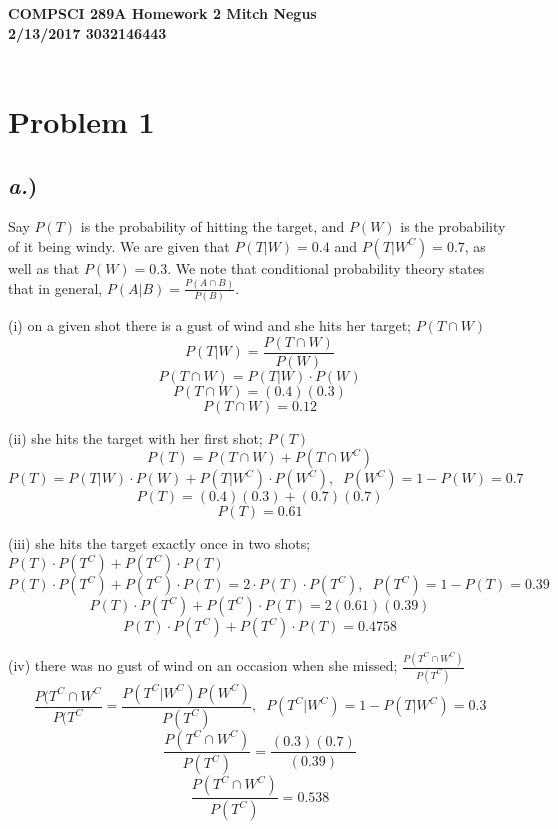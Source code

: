 \documentclass{report}
\begin{document}
\thispagestyle{empty}

{\bf {\large {COMPSCI 289A} Homework {2} \hfill Mitch Negus\\
		2/13/2017 						\hfill	3032146443}}\\\\


\section*{Problem 1}

\subsection*{\textit{a.})}

Say $P(T)$ is the probability of hitting the target, and $P(W)$ is the probability of it being windy. We are given that $P(T|W) = 0.4$ and $P(T|W^{C}) = 0.7$, as well as that $P(W) = 0.3$. We note that conditional probability theory states that in general, $P(A|B) = \frac{P(A \cap B)}{P(B)}$.

(i) on a given shot there is a gust of wind and she hits her target; $P(T \cap W)$\\
	$$ P(T|W) = \frac{P(T \cap W)}{P(W)} $$
	$$ P(T \cap W) = P(T|W) \cdot P(W) $$
	$$ P(T \cap W) = (0.4)(0.3) $$
	$$\boxed{ P(T \cap W) = 0.12 } $$
	
(ii) she hits the target with her first shot; $P(T)$\\
	$$ P(T) = P(T \cap W) + P(T \cap W^{C}) $$
	$$ P(T) = P(T|W) \cdot P(W) + P(T|W^{C}) \cdot P(W^{C}), \;\; P(W^{C}) = 1-P(W) = 0.7$$
	$$ P(T) = (0.4)(0.3) + (0.7)(0.7) $$
	$$\boxed{ P(T) = 0.61 }$$

(iii) she hits the target exactly once in two shots; $P(T) \cdot P(T^{C}) + P(T^{C}) \cdot P(T)$
	$$ P(T) \cdot P(T^{C}) + P(T^{C}) \cdot P(T) = 2 \cdot P(T) \cdot P(T^{C}), \;\; P(T^{C}) = 1-P(T) = 0.39 $$
	$$ P(T) \cdot P(T^{C}) + P(T^{C}) \cdot P(T) = 2(0.61)(0.39) $$
	$$\boxed{ P(T) \cdot P(T^{C}) + P(T^{C}) \cdot P(T) = 0.4758 }$$
	
(iv) there was no gust of wind on an occasion when she missed; $\frac{P(T^{C}\cap W^{C})}{P(T^{C})}$ 
	$$ \frac{P(T^{C} \cap W^{C}}{P(T^{C}} = \frac{P(T^{C}|W^{C})P(W^{C})}{P(T^{C})}, \;\; P(T^{C}|W^{C}) = 1-P(T|W^{C}) = 0.3$$
	$$ \frac{P(T^{C} \cap W^{C})}{P(T^{C})} = \frac{(0.3)(0.7)}{(0.39)}$$
	$$\boxed{ \frac{P(T^{C} \cap W^{C})}{P(T^{C})} = 0.538 }$$
	
\end{document}
